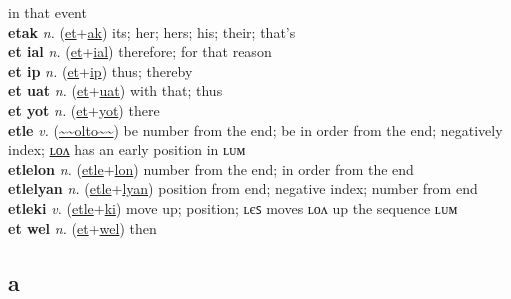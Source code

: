 in that event \label{et ayf} \\
\textbf{etak} \textit{n.} (\hyperref[et]{et}+\hyperref[ak]{ak})
its; her; hers; his; their; that's \label{etak} \\
\textbf{et ial} \textit{n.} (\hyperref[et]{et}+\hyperref[al]{ial})
therefore; for that reason \label{et ial} \\
\textbf{et ip} \textit{n.} (\hyperref[et]{et}+\hyperref[p]{ip})
thus; thereby \label{et ip} \\
\textbf{et uat} \textit{n.} (\hyperref[et]{et}+\hyperref[at]{uat})
with that; thus \label{et uat} \\
\textbf{et yot} \textit{n.} (\hyperref[et]{et}+\hyperref[ot]{yot})
there \label{et yot} \\
\textbf{etle} \textit{v.} (\hyperref[olto]{\~{}\~{}olto\~{}\~{}})
be number from the end; be in order from the end; negatively index; \hyperref[etlelon]{ʟᴏᴧ} has an early position in ʟᴜᴍ \label{etle} \\
\textbf{etlelon} \textit{n.} (\hyperref[etle]{etle}+\hyperref[lon]{lon})
number from the end; in order from the end \label{etlelon} \\
\textbf{etlelyan} \textit{n.} (\hyperref[etle]{etle}+\hyperref[lyan]{lyan})
position from end; negative index; number from end \label{etlelyan} \\
\textbf{etleki} \textit{v.} (\hyperref[etle]{etle}+\hyperref[ki]{ki})
move up; position; ʟєꜱ moves ʟᴏᴧ up the sequence ʟᴜᴍ \label{etleki} \\
\textbf{et wel} \textit{n.} (\hyperref[et]{et}+\hyperref[el]{wel})
then \label{et wel} \\
\subsection{a}


